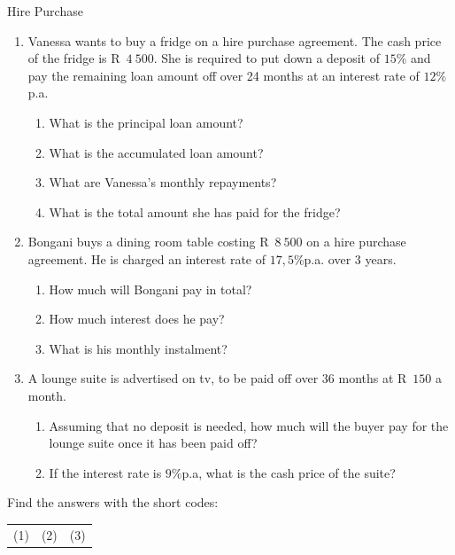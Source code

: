 \begin{exercises}{Hire Purchase}
    \begin{enumerate}[label=\textbf{\arabic*}.]
	\item Vanessa wants to buy a fridge on a hire purchase agreement. The cash price of the fridge is R~$4~500$. She is required to put down a deposit of $15\%$ and pay the remaining loan amount off over 24 months at an interest rate of $12\%$ p.a.
	\begin{enumerate}
	    \item What is the principal loan amount?
	    \item What is the accumulated loan amount?
	    \item What are Vanessa’s monthly repayments?
	    \item What is the total amount she has paid for the fridge?
	\end{enumerate}


	\item Bongani buys a dining room table costing R~$8~500$ on a hire purchase agreement. He is charged an interest rate of $17,5\%$p.a. over 3 years.
	\begin{enumerate}
	    \item How much will Bongani pay in total?
	    \item How much interest does he pay?
	    \item What is his monthly instalment?
	\end{enumerate}

	\item A lounge suite is advertised on tv, to be paid off over 36 months at R~$150$ a month.
	\begin{enumerate}
	    \item Assuming that no deposit is needed, how much will the buyer pay for the lounge suite once it has been paid off?
	    \item If the interest rate is $9\%$p.a, what is the cash price of the suite?\\
	\end{enumerate}
    \end{enumerate}

    Find the answers with the short codes:\\
    \begin{tabularx}{\textwidth}{ XXX }
	(1)	&	(2)	&	(3)\\
    \end{tabularx}
\end{exercises}


